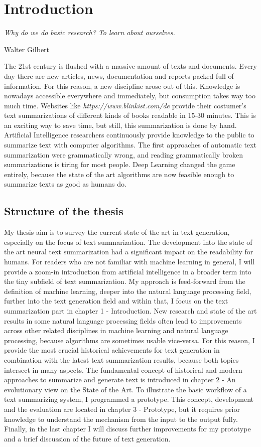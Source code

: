 \chapter{Introduction}\label{ch:intro}

\epigraph{\textit{Why do we do basic research? To learn about ourselves.}}{Walter Gilbert}

The 21st century is flushed with a massive amount of texts and documents. Every day there are new articles, news, documentation and reports packed full of information. For this reason, a new discipline arose out of this. Knowledge is nowadays accessible everywhere and immediately, but consumption takes way too much time. Websites like \textit{https://www.blinkist.com/de} provide their costumer's text summarizations of different kinds of books readable in 15-30 minutes. This is an exciting way to save time, but still, this summarization is done by hand. Artificial Intelligence researchers continuously provide knowledge to the public to summarize text with computer algorithms. The first approaches of automatic text summarization were grammatically wrong, and reading grammatically broken summarizations is tiring for most people. Deep Learning changed the game entirely, because the state of the art algorithms are now feasible enough to summarize texts as good as humans do.

\section{Structure of the thesis}
My thesis aim is to survey the current state of the art in text generation, especially on the focus of text summarization. The development into the state of the art neural text summarization had a significant impact on the readability for humans. For readers who are not familiar with machine learning in general, I will provide a zoom-in introduction from artificial intelligence in a broader term into the tiny subfield of text summarization. My approach is feed-forward from the definition of machine learning, deeper into the natural language processing field, further into the text generation field and within that, I focus on the text summarization part in chapter 1 - Introduction. New research and state of the art results in some natural language processing fields often lead to improvements across other related disciplines in machine learning and natural language processing, because algorithms are sometimes usable vice-versa. For this reason, I provide the most crucial historical achievements for text generation in combination with the latest text summarization results, because both topics intersect in many aspects. The fundamental concept of historical and modern approaches to summarize and generate text is introduced in chapter 2 - An evolutionary view on the State of the Art. 
To illustrate the basic workflow of a text summarizing system, I programmed a prototype. This concept, development and the evaluation  are located in chapter 3 - Prototype, but it requires prior knowledge to understand the mechanism from the input to the output fully. Finally, in the last chapter I will discuss further improvements for my prototype and a brief discussion of the future of text generation.

